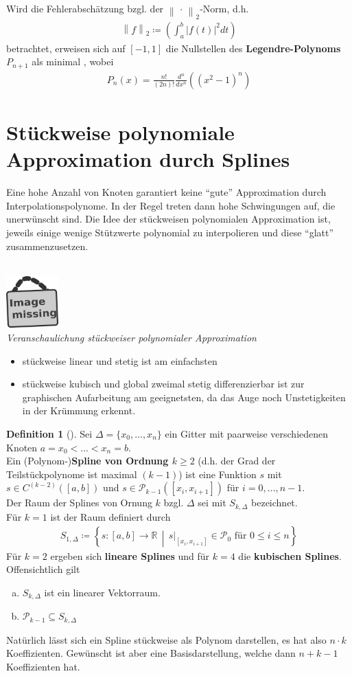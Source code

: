 \documentclass[ngerman,fontsize=11pt, paper=a4, parskip=half, titlepage=true, toc=bib]{scrbook}
\theoremstyle{definition}
\newtheorem{Def}{Definition}[section]		%
\theoremstyle{plain}
\newcommand{\R}{\mathds{R}}
\newcommand{\nn}[1]{\left\| #1 \right\|}	%
\newcommand{\extrasection}[2]{\vspace{1.5eM}\minisec{\Large\itshape \thesection #1 #2}\vspace{1eM}}
\newcommand{\sectione}[1]{ \setcounter{equation}{0}\section{#1}}
\newenvironment{Defe}[1][]{ %
  \begin{Def}[#1]}
  {\end{Def}
  	\addtocounter{subsection}{1}}
\newcommand{\imagemissing}[1]{
  \begin{center}~\\
    \centering 
    \includegraphics[width=2cm]{images/image_missing.jpg}\\
    \textit{#1} \\
  \end{center}
}
\begin{document}
Wird die Fehlerabschätzung bzgl. der 
$\nn{\,\cdot\,}_2$-Norm,
d.h. 
\begin{gather*}
  \nn{f}_2\coloneqq \left(\int_{a}^{b}|f(t)|^2dt  \right)
\end{gather*}
betrachtet, erweisen sich auf $[-1,1]$ die Nullstellen
des \textbf{Legendre-Polynoms} $P_{n+1}$
als minimal \cite{haemmerlinhoffmann}, wobei
\begin{gather*}
  P_n(x) = \frac{n!}{(2n)!}\frac{d^n}{dx^n}\left((x^2-1)^n\right)
\end{gather*}

\sectione{Stückweise polynomiale Approximation durch Splines}
Eine hohe Anzahl von Knoten garantiert keine \enquote{gute}
Approximation durch Interpolationspolynome.
In der Regel treten dann hohe Schwingungen auf,
die unerwünscht sind.
Die Idee der stückweisen polynomialen Approximation ist,
jeweils einige wenige Stützwerte polynomial zu interpolieren
und diese \enquote{glatt} zusammenzusetzen.
\imagemissing{Veranschaulichung stückweiser polynomialer Approximation}
\begin{itemize}
  \item stückweise linear und stetig ist am einfachsten
  \item stückweise kubisch und global zweimal stetig differenzierbar
    ist zur graphischen Aufarbeitung am geeignetsten,
    da das Auge noch Unstetigkeiten in der Krümmung erkennt.
\end{itemize}

\extrasection{a)}{Splines und zwei verschiedene Basen}
\begin{Defe}
  Sei $\Delta =\{x_0,\dots,x_n\} $ ein Gitter
  mit paarweise verschiedenen Knoten $a=x_0<\dots<x_n=b$.\\
Ein (Polynom-)\textbf{Spline von Ordnung $k$}$\geq 2$ 
(d.h. der Grad der Teilstückpolynome ist maximal $(k-1)$)
ist eine Funktion $s$ mit $s\in C^{(k-2)}([a,b])$
und $s\in\mathcal{P}_{k-1}([x_i,x_{i+1}])$
für $i=0,\dots,n-1$.\\
Der Raum der Splines von Ornung $k$ bzgl. $\Delta$ sei
mit $S_{k,\Delta}$ bezeichnet.\\
Für $k=1$ ist der Raum definiert durch
\begin{gather*}
  S_{1,\Delta} \coloneqq 
  \left\{
    s:[a,b]\rightarrow\R\,\middle\vert\,
    s|_{[x_i,x_{i+1}]}\in\mathcal{P}_0
      \text{ für } 0\leq i\leq n
  \right\}
\end{gather*}
Für $k=2$ ergeben sich \textbf{lineare Splines}
und für $k=4$ die \textbf{kubischen Splines}.\\
Offensichtlich gilt
\begin{enumerate}[a)]
  \item $S_{k,\Delta}$ ist ein linearer Vektorraum.
  \item $\mathcal{P}_{k-1}\subseteq S_{k,\Delta}$
\end{enumerate}
Natürlich lässt sich ein Spline stückweise als Polynom darstellen,
es hat also $n\cdot k$ Koeffizienten.
Gewünscht ist aber eine Basisdarstellung,
welche dann $n+k-1$ Koeffizienten hat.
\end{Defe}
\end{document}
